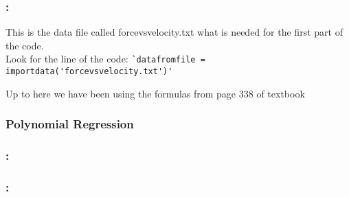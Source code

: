 \documentclass[xcolor=dvipsnames,11pt]{beamer}
\begin{document}
\begin{frame}[fragile]
	
	\frametitle{\subsecname: \subsubsecname}
	
	\vspace{-3pt}	
	

\begin{block}{}
This is the data file called forcevsvelocity.txt what is needed for the first part of the code. \\
Look for the line of the code: 
\verb|`datafromfile = importdata('forcevsvelocity.txt')'|
\end{block}

\begin{block}{}
Up to here we have been using the formulas from page 338 of textbook
\end{block}

	
\end{frame}


\subsubsection{Polynomial Regression}

\begin{frame}
	
	\frametitle{\subsecname: \subsubsecname}


	\vspace{-3pt}	
	
	
\end{frame}

\begin{frame}
	
	\frametitle{\subsecname: \subsubsecname}
	
	\vspace{-3pt}	
	
	
\end{frame}
\end{document}
